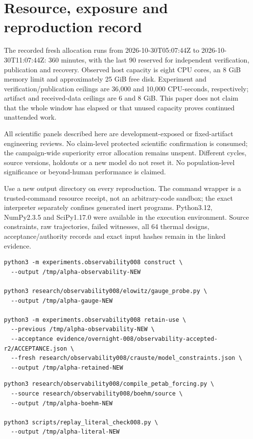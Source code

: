 \documentclass[11pt,letterpaper]{article}
\begin{document}
\section{Resource, exposure and reproduction record}
The recorded fresh allocation runs from 2026-10-30T05:07:44Z to 2026-10-30T11:07:44Z: 360 minutes, with the last 90 reserved for independent verification, publication and recovery. Observed host capacity is eight CPU cores, an 8 GiB memory limit and approximately 25 GiB free disk. Experiment and verification/publication ceilings are 36,000 and 10,000 CPU-seconds, respectively; artifact and received-data ceilings are 6 and 8 GiB. This paper does not claim that the whole window has elapsed or that unused capacity proves continued unattended work.\par
All scientific panels described here are development-exposed or fixed-artifact engineering reviews. No claim-level protected scientific confirmation is consumed; the campaign-wide superiority error allocation remains unspent. Different cycles, source versions, holdouts or a new model do not reset it. No population-level significance or beyond-human performance is claimed.\par
Use a new output directory on every reproduction. The command wrapper is a trusted-command resource receipt, not an arbitrary-code sandbox; the exact interpreter separately confines generated inert programs. Python3.12, NumPy2.3.5 and SciPy1.17.0 were available in the execution environment. Source constraints, raw trajectories, failed witnesses, all 64 thermal designs, acceptance/authority records and exact input hashes remain in the linked evidence.\par
\begin{lstlisting}
python3 -m experiments.observability008 construct \
  --output /tmp/alpha-observability-NEW

python3 research/observability008/elowitz/gauge_probe.py \
  --output /tmp/alpha-gauge-NEW

python3 -m experiments.observability008 retain-use \
  --previous /tmp/alpha-observability-NEW \
  --acceptance evidence/overnight-008/observability-accepted-r2/ACCEPTANCE.json \
  --fresh research/observability008/crauste/model_constraints.json \
  --output /tmp/alpha-retained-NEW
\end{lstlisting}
\begin{lstlisting}
python3 research/observability008/compile_petab_forcing.py \
  --source research/observability008/boehm/source \
  --output /tmp/alpha-boehm-NEW

python3 scripts/replay_literal_check008.py \
  --output /tmp/alpha-literal-NEW
\end{lstlisting}
\end{document}
